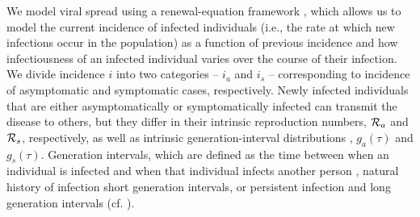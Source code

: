 We model viral spread using a renewal-equation framework \citep{heesterbeek1996concept}, which allows us to model the current incidence of infected individuals (i.e., the rate at which new infections occur in the population) as a function of previous incidence and how infectiousness of an infected individual varies over the course of their infection.
We divide incidence $i$ into two categories -- $i_a$ and $i_s$ -- corresponding to incidence of asymptomatic and symptomatic cases, respectively.
Newly infected individuals that are either asymptomatically or symptomatically infected can transmit the disease to others, but they differ in their intrinsic reproduction numbers, ${\cal{R}}_a$ and ${\cal{R}}_s$, respectively, as well as intrinsic generation-interval distributions \citep{champredon2015intrinsic}, $g_a(\tau)$ and $g_s(\tau)$.
Generation intervals, which are defined as the time between when an individual is infected and when that individual infects another person \citep{svensson2007note}, \DIFdelbegin {}\DIFdelend \DIFaddbegin {}\DIFaddend natural history of infection \DIFdelbegin {}\DIFdelend \DIFaddbegin {}\DIFaddend short generation intervals, or \DIFaddbegin {}\DIFaddend persistent infection and long generation intervals (cf. \citep{roberts2007model}).
\DIFdelbegin {}\DIFdelend 

